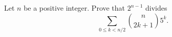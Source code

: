 \documentclass{article}
\begin{document}
\setlength{\parindent}{0pt}
Let $n$ be a positive integer. Prove that $2^{n-1}$ divides$$\sum_{0\le k<n/2}\binom{n}{2k+1}5^{k}.$$
\end{document}
